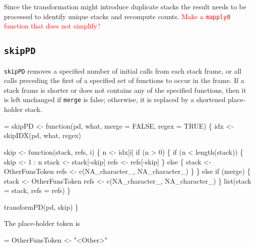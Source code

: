 \documentclass[11pt]{article}
\newcommand{\FIXME}[1]{\textcolor{red}{#1}}
\begin{document}
Since the transformation might introduce duplicate stacks the result
needs to be processed to identify unique stacks and recompute counts.
\FIXME{Make a \Verb!mapply0! function that does not simplify?}

\subsection{\texttt{skipPD}}
\Verb!skipPD! removes a specified number of initial calls from each stack
frame, or all calls preceding the first of a specified set of
functions to occur in the frame. If a stack frams is shorter or does
not contains any of the specified functions, then it is left unchanged
if \Verb!merge! is false; otherwise, it is replaced by a shortened
place-holder stack.
\begin{nwchunk}
=
 skipPD <- function(pd, what, merge = FALSE, regex = TRUE) \{
     idx <- skipIDX(pd, what, regex)
 
     skip <- function(stack, refs, i) \{
         n <- idx[i]
         if (n > 0) \{
             if (n < length(stack)) \{
                 skip <- 1 : n
                 stack <- stack[-skip]
                 refs <- refs[-skip]
             \}
             else \{
                 stack <- OtherFunsToken
                 refs <- c(NA_character_, NA_character_)
             \}
         \}
         else if (merge) \{
             stack <- OtherFunsToken
             refs <- c(NA_character_, NA_character_)
         \}
         list(stack = stack, refs = refs)
     \}
 
     transformPD(pd, skip)
 \}
\end{nwchunk}
The place-holder token is
\begin{nwchunk}
=
 OtherFunsToken <- "<Other>"
\end{nwchunk}
\end{document}
